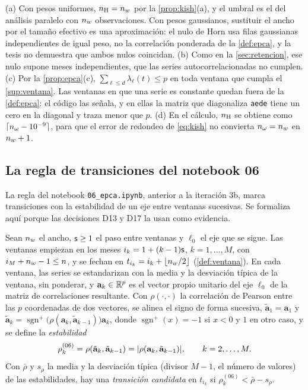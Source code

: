 \begin{observacion}\label{obs:umbral-ventana}
(a) Con pesos uniformes, $n_{\mathrm{H}}=n_{w}$ por la \cref{prop:kish}(a), y el umbral es el del análisis
paralelo con $n_{w}$ observaciones. Con pesos gaussianos, sustituir el ancho por el tamaño efectivo
es una aproximación: el nulo de Horn usa filas gaussianas independientes de igual peso, no la
correlación ponderada de la \cref{def:epca}, y la tesis no demuestra que ambos nulos coincidan.
(b) Como en la \cref{sec:retencion}, ese nulo supone meses independientes, que las series
autocorrelacionadas no cumplen. (c) Por la \cref{prop:epca}(c),
$\sum_{\ell\le d}\lambda_\ell(t)\le p$ en toda ventana que cumpla el \cref{sup:ventana}. Las
ventanas en que una serie es constante quedan fuera de la \cref{def:epca}: el código las señala,
y en ellas la matriz que diagonaliza \texttt{aede} tiene un cero en la diagonal y traza menor que
$p$. (d) En el cálculo, $n_{\mathrm{H}}$ se obtiene como $\lceil n_{\omega}-10^{-9}\rceil$, para que el error de
redondeo de \cref{eq:kish} no convierta $n_{\omega}=n_{w}$ en $n_{w}+1$.
\end{observacion}

\subsection{La regla de transiciones del notebook 06}
\label{sec:regla06}

La regla del notebook \texttt{06\_epca.ipynb}, anterior a la iteración 3b, marca transiciones con
la estabilidad de un eje entre ventanas sucesivas. Se formaliza aquí porque las decisiones D13 y
D17 la usan como evidencia.

\begin{definicion}\label{def:regla06}
Sean $n_{w}$ el ancho, $\mathsf{s}\ge1$ el paso entre ventanas y $\ell_0$ el eje que se sigue. Las ventanas
empiezan en los meses $i_k=1+(k-1)\mathsf{s}$, $k=1,\dots,M$, con $i_M+n_{w}-1\le n$, y se fechan en
$t_{i_k}=i_k+\lfloor n_{w}/2\rfloor$ (\cref{def:ventana}). En cada ventana, las series se estandarizan
con la media y la desviación típica de la ventana, sin ponderar, y $\mathbf{a}_k\in\mathbb{R}^p$ es el
vector propio unitario del eje $\ell_0$ de la matriz de correlaciones resultante. Con $\rho(\cdot,
\cdot)$ la correlación de Pearson entre las $p$ coordenadas de dos vectores, se alinea el signo de
forma sucesiva, $\tilde{\mathbf{a}}_1=\mathbf{a}_1$ y
$\tilde{\mathbf{a}}_k=\operatorname{sgn}^{+}\!\bigl(\rho(\mathbf{a}_k,\tilde{\mathbf{a}}_{k-1})\bigr)
\mathbf{a}_k$, donde $\operatorname{sgn}^{+}(x)=-1$ si $x<0$ y $1$ en otro caso, y se define la
\emph{estabilidad}
\[
  \rho^{(06)}_k=\rho(\tilde{\mathbf{a}}_k,\tilde{\mathbf{a}}_{k-1})
  =\lvert \rho(\mathbf{a}_k,\tilde{\mathbf{a}}_{k-1})\rvert,\qquad k=2,\dots,M.
\]
Con $\bar\rho$ y $s_\rho$ la media y la desviación típica (divisor $M-1$, el número de valores) de
las estabilidades, hay una \emph{transición candidata} en $t_{i_k}$ si
$\rho^{(06)}_k<\bar\rho-s_\rho$.
\end{definicion}

